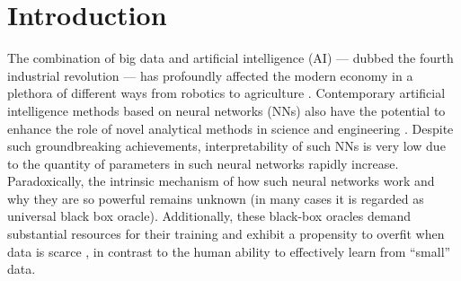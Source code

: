 \documentclass[%
  pra, aps, physrev,
  showkeys,
  twocolumn,
  showpacs,
  superscriptaddress,
  amsmath,amssymb,
  10pt
]{revtex4-2}
\begin{document}
\maketitle



\section{Introduction}
The combination of big data and artificial intelligence (AI) ---  dubbed the fourth industrial revolution --- has profoundly affected the modern economy in a plethora of different ways from robotics to agriculture \cite{Lecun2015, ghahramani2015,schwab2017,esteva2019, tyrsa2017}.
Contemporary artificial intelligence methods based on neural networks (NNs) also have the potential to enhance the role of novel analytical methods in science and engineering \cite{kaggle2014, radovic2018, butler2018, radovic2018,NobelPrizeChemistry,NobelPrizePhysics}.
Despite such groundbreaking achievements, interpretability of such NNs is very low due to the quantity of parameters in such neural networks rapidly increase.
Paradoxically, the intrinsic mechanism of how such neural networks work and why they are so powerful remains unknown (in many cases it is regarded as universal black box oracle).
Additionally, these black-box oracles demand substantial resources for their training and exhibit a propensity to overfit when data is scarce \cite{sevilla2022compute}, in contrast to the human ability to effectively learn from ``small'' data.

\end{document}
